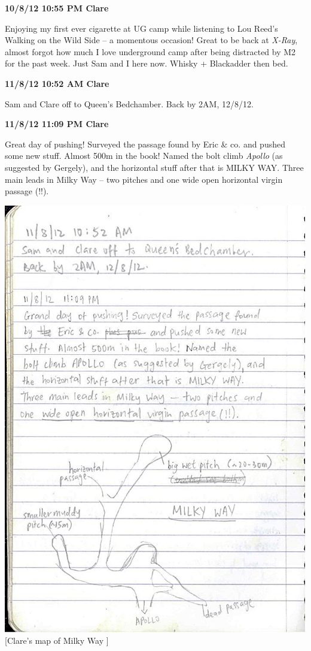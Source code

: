 \textbf{10/8/12 10:55 PM Clare}

Enjoying my first ever cigarette at UG camp while listening to Lou
Reed's Walking on the Wild Side -- a momentous occasion! Great to be
back at \emph{X-Ray}, almost forgot how much I love underground camp
after being distracted by M2 for the past week. Just Sam and I here now.
Whisky + Blackadder then bed.

\textbf{11/8/12 10:52 AM Clare}

Sam and Clare off to Queen's Bedchamber. Back by 2AM, 12/8/12.

\textbf{11/8/12 11:09 PM Clare}

Great day of pushing! Surveyed the passage found by Eric \& co. and
pushed some new stuff. Almost 500m in the book! Named the bolt climb
\emph{Apollo} (as suggested by Gergely), and the horizontal stuff after
that is MILKY WAY. Three main leads in Milky Way -- two pitches and one
wide open horizontal virgin passage (!!).

\includegraphics{UgLog1012/89.jpeg}\\
{[}Clare's map of Milky Way {]}

